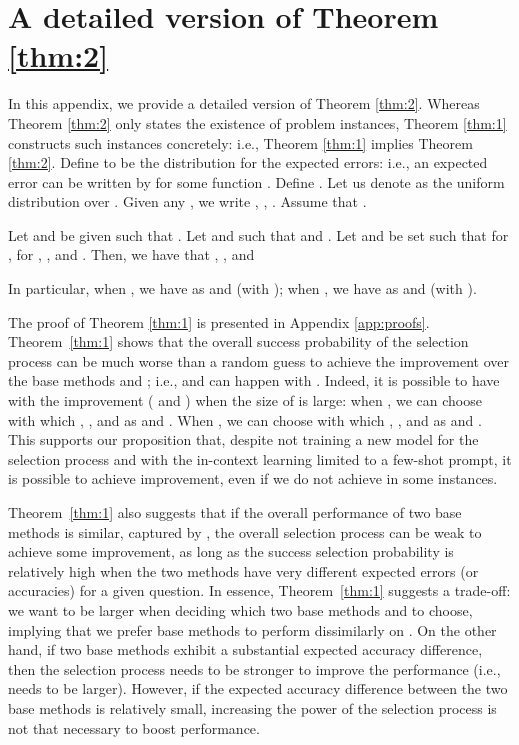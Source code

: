 \documentclass[11pt]{article}
\begin{document}



\clearpage
\appendix
\label{sec:appendix}

\onecolumn


\section{A detailed version of Theorem \ref{thm:2}} \label{app:thm:2_detail}
In this appendix, we provide a detailed version of Theorem \ref{thm:2}. Whereas Theorem \ref{thm:2} only states the existence of problem instances, Theorem \ref{thm:1} constructs such instances concretely: i.e., Theorem \ref{thm:1} implies Theorem \ref{thm:2}. Define  to be the distribution for the expected errors: i.e., an expected error can be written by  for some function . Define . Let us denote  as the uniform distribution over .
 Given any , we write , ,  . Assume that .
\begin{theorem} \label{thm:1}
Let  and   be given such that . Let  and  such that  and  . Let  and  be set such that 
   for ,   for ,   , and  . Then, we have  that  , , and 

In particular, when , we have   as  and  (with   ); when  , we have  as  and  (with  ).
\end{theorem}
The proof of Theorem \ref{thm:1} is presented in Appendix \ref{app:proofs}. Theorem~\ref{thm:1} shows that the overall success probability of the selection process can be much worse than a random guess to achieve the improvement over the base methods  and ; i.e.,  and  can happen with . Indeed, it is possible to have  with the improvement ( and ) when the size of  is large: when , we can choose  with which   , , and  as  and . When  , we can choose  with which   , , and  as  and . This supports our proposition that, despite not training a new model for the selection process and with the in-context learning limited to a few-shot prompt, it is possible to achieve improvement, even if we do not achieve  in some instances.


Theorem~\ref{thm:1} also suggests that if the overall performance of two base methods is similar, captured by , the overall selection process can be weak to achieve some improvement, as long as the success selection probability is relatively high when the two methods have very different expected errors (or accuracies) for a given question. In essence, Theorem~\ref{thm:1} suggests a trade-off: we want  to be larger when deciding which two base methods  and  to choose, implying that we prefer base methods to perform dissimilarly on . On the other hand, if two base methods exhibit a substantial expected accuracy difference, then the selection process needs to be stronger to improve the performance (i.e.,  needs to be larger). However, if the expected accuracy difference between the two base methods is relatively small, increasing the power of the selection process is not that necessary to boost performance.
\end{document}
